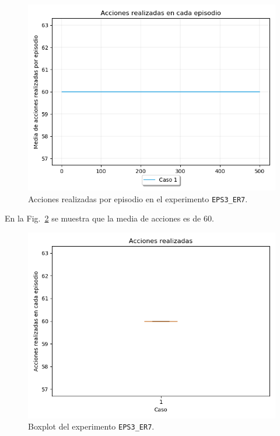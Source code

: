 \begin{figure}
    \centering
    \includegraphics[scale=0.4]{cap5_experimentacion/images/dim5_lr0.01_ep0.6_acciones.png}
    \caption{Acciones realizadas por episodio en el experimento \texttt{EPS3\_ER7}.}
    \label{fig:dim5_lr0.01_ep0.6_acciones}
\end{figure}

En la Fig.~\ref{fig:dim5_lr0.01_ep0.6_boxplot} se muestra que la media de acciones es de 60. \\ 

\begin{figure}
    \centering
    \includegraphics[scale=0.4]{cap5_experimentacion/images/dim5_lr0.01_ep0.6_boxplot.png}
    \caption{Boxplot del experimento \texttt{EPS3\_ER7}.}
    \label{fig:dim5_lr0.01_ep0.6_boxplot}
\end{figure}

